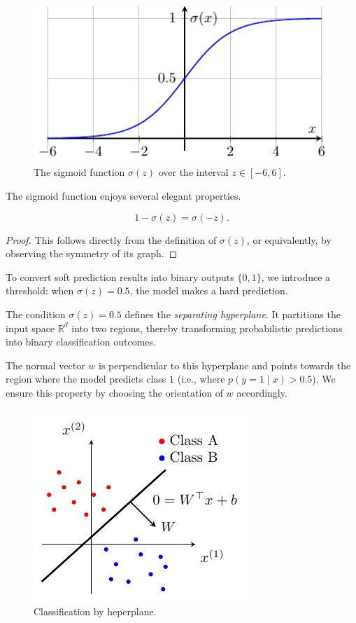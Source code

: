 \documentclass[../main]{subfiles}
\begin{document}
\begin{figure}[H]
  \centering
  \includegraphics{../../tikz/2/1.pdf}
  \caption{The sigmoid function $\sigma(z)$ over the interval $z \in [-6,6]$.}
\end{figure}

The sigmoid function enjoys several elegant properties.

\begin{theorem}
\[
1 - \sigma(z) = \sigma(-z) .
\]
\end{theorem}

\begin{proof}
This follows directly from the definition of $\sigma(z)$, or equivalently, by observing the symmetry of its graph.
\end{proof}

To convert soft prediction results into binary outputs $\{0,1\}$, we introduce a threshold: when $\sigma(z) = 0.5$, the model makes a hard prediction.

\begin{definition}
The condition $\sigma(z) = 0.5$ defines the \emph{separating hyperplane}. It partitions the input space $\mathbb{R}^d$ into two regions, thereby transforming probabilistic predictions into binary classification outcomes.
\end{definition}
The normal vector $w$ is perpendicular to this hyperplane and points towards the region where the model predicts class $1$ 
(i.e., where $p(y=1 \mid x) > 0.5$). 
We ensure this property by choosing the orientation of $w$ accordingly.
\begin{figure}[H]
  \centering
  \includegraphics{../../tikz/2/2.pdf}
  \caption{Classification by heperplane.}
  \label{2-lr}
\end{figure}
\end{document}
